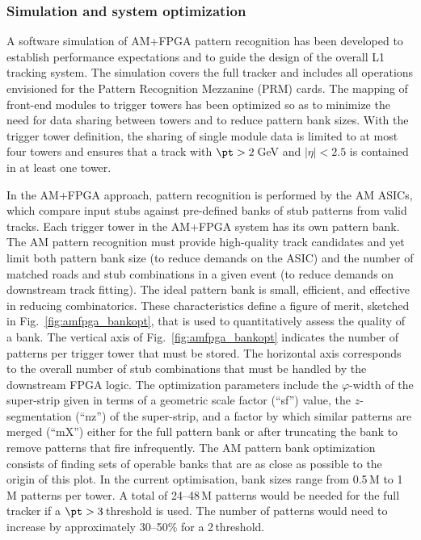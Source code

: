 \subsubsection{Simulation and system optimization}
\label{sec:Part2_Chapter4_TrackTrigger-AM_simulation}
A software simulation of AM+FPGA pattern recognition has been developed to establish performance expectations and to guide the design of the overall L1 tracking system. The simulation covers the full tracker and includes all operations envisioned for the  Pattern Recognition Mezzanine (PRM) cards. The mapping of front-end modules to trigger towers has been optimized so as to minimize the need for data sharing between towers and to reduce pattern bank sizes. With the trigger tower definition, the sharing of single module data is limited to at most four towers and ensures that a track  
with $\pt > 2$\,GeV and $|\eta|<2.5$ is contained in at least one tower.

In the AM+FPGA approach, pattern recognition is performed by the AM ASICs, which compare input stubs against pre-defined banks of stub patterns from valid tracks. Each trigger tower in the AM+FPGA system has its own pattern bank. The AM pattern recognition must provide high-quality track candidates and yet limit both pattern bank size (to reduce demands on the ASIC) and the number of matched roads and stub combinations in a given event (to reduce demands on downstream track fitting). The ideal pattern bank is small, efficient, and effective in reducing combinatorics. These characteristics define a figure of merit, sketched in Fig.~\ref{fig:amfpga_bankopt}, that is used to quantitatively assess the quality of a bank. The vertical axis of Fig.~\ref{fig:amfpga_bankopt} indicates the number of patterns per trigger tower that must be stored. The horizontal axis corresponds to the overall number of stub combinations that must be handled by the downstream FPGA logic.  The optimization parameters include the $\varphi$-width of the super-strip given in terms of a geometric scale factor (``sf'') value, the $z$-segmentation (``nz'') of the super-strip, and a factor by which similar patterns are merged (``mX'') either for the full pattern bank or after truncating the bank to remove patterns that fire infrequently.  The AM pattern bank optimization consists of finding sets of operable banks that are as close as possible to the origin of this plot. In the current optimisation, bank sizes range from 0.5\,M to 1\,M patterns per tower. A total of 24--48\,M patterns would be needed for the full tracker if a $\pt > 3$\,\GeV threshold is used.  The number of patterns would need to increase by approximately 30--50\% for a 2\,\GeV threshold.

